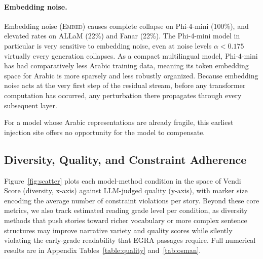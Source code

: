 \documentclass[11pt]{article}
\begin{document}
\paragraph{Embedding noise.} Embedding noise (\textsc{Embed}) causes complete collapse on Phi-4-mini (100\%), and elevated rates on ALLaM (22\%) and Fanar (22\%). The Phi-4-mini model in particular is very sensitive to embedding noise, even at noise levels $\alpha < 0.175$ virtually every generation collapses. As a compact multilingual model, Phi-4-mini has had comparatively less Arabic training data, meaning its token embedding space for Arabic is more sparsely and less robustly organized. Because embedding noise acts at the very first step of the residual stream, before any transformer computation has occurred, any perturbation there propagates through every subsequent layer. 

For a model whose Arabic representations are already fragile, this earliest injection site offers no opportunity for the model to compensate.

\subsection{Diversity, Quality, and Constraint Adherence}
\label{sec:mainResults}

Figure~\ref{fig:scatter} plots each model-method condition in the space of Vendi Score (diversity, x-axis) against LLM-judged quality (y-axis), with marker size encoding the average number of constraint violations per story. Beyond these core metrics, we also track estimated reading grade level per condition, as diversity methods that push stories toward richer vocabulary or more complex sentence structures may improve narrative variety and quality scores while silently violating the early-grade readability that EGRA passages require. Full numerical results are in Appendix Tables~\ref{table:quality} and~\ref{tab:osman}.
\end{document}
